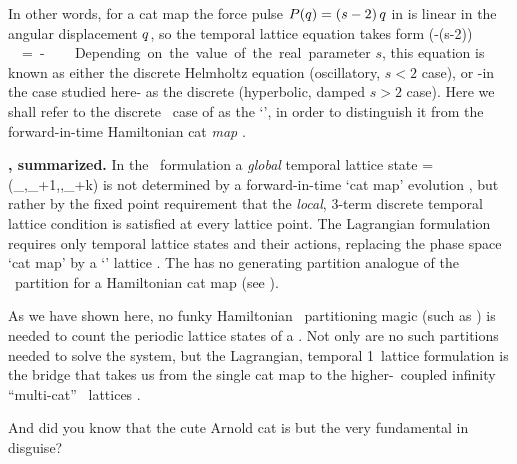 In other words, for a cat map the force pulse $P(q)=(s-2)\,q$
in  is linear in the angular displacement $q$, so
the temporal lattice equation takes form
\beq
(\Box -(s-2)\unit)\,\Xx =-\Mm
\,.
Depending on the value of the real parameter $s$, this equation is known
as either the discrete Helmholtz equation (oscillatory, $s<2$ case), or
-in the case studied here- as the discrete {\em \sPe} (hyperbolic, damped
$s>2$ case). Here we shall refer to the discrete
\sPe\ case of  as the `{\em \templatt}', in order to
distinguish it from the forward-in-time Hamiltonian cat \emph{map} .

\bigskip

\noindent\textbf{\tempLatt, summarized.}
In the \spt\ formulation a \emph{global} {temporal lattice state}
\beq
\transp{\Xx} %
             = (\ssp_\zeit,\ssp_{\zeit+1},\cdots,\ssp_{\zeit+k})
is not determined by a forward-in-time `cat map' evolution
, but rather by the fixed point requirement
 that the \emph{local}, 3-term discrete temporal
lattice condition  is satisfied at every lattice
point. The Lagrangian formulation requires only temporal lattice states
and their actions, replacing the phase space `cat map' 
by a `{\templatt}' lattice . The {\templatt} has no
generating partition analogue of the \AW\ partition for a Hamiltonian cat
map (see ).

As we have shown here, no funky Hamiltonian \statesp\ partitioning magic
(such as ) is needed to count the periodic
lattice states of a \templatt. Not only are no such partitions needed to
solve the system, but the Lagrangian, temporal 1\dmn\ lattice formulation
is the bridge that takes us from the single cat map  to
the higher-\dmn\ coupled infinity ``multi-cat'' \spt\ lattices
.

And did you know that the cute Arnold cat is but the very fundamental
{\sPe} in disguise?


\renewcommand{\period}[1]{{\ensuremath{T_{#1}}}}         %

